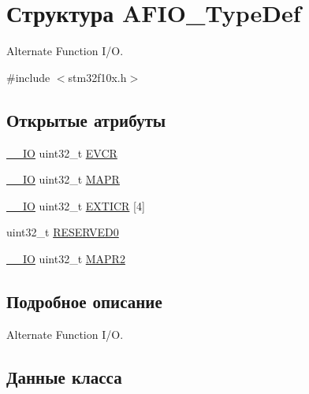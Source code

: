 \hypertarget{struct_a_f_i_o___type_def}{}\section{Структура A\+F\+I\+O\+\_\+\+Type\+Def}
\label{struct_a_f_i_o___type_def}


Alternate Function I/O.  




{\ttfamily \#include $<$stm32f10x.\+h$>$}

\subsection*{Открытые атрибуты}
\begin{DoxyCompactItemize}
\item 
\mbox{\hyperlink{group___c_m_s_i_s___c_m3__core__definitions_gaec43007d9998a0a0e01faede4133d6be}{\+\_\+\+\_\+\+IO}} uint32\+\_\+t \mbox{\hyperlink{struct_a_f_i_o___type_def_a377d5227cd20950e4489cd04df16500f}{E\+V\+CR}}
\item 
\mbox{\hyperlink{group___c_m_s_i_s___c_m3__core__definitions_gaec43007d9998a0a0e01faede4133d6be}{\+\_\+\+\_\+\+IO}} uint32\+\_\+t \mbox{\hyperlink{struct_a_f_i_o___type_def_a2b44ba1a427df7d8c0b254f869b9b463}{M\+A\+PR}}
\item 
\mbox{\hyperlink{group___c_m_s_i_s___c_m3__core__definitions_gaec43007d9998a0a0e01faede4133d6be}{\+\_\+\+\_\+\+IO}} uint32\+\_\+t \mbox{\hyperlink{struct_a_f_i_o___type_def_a5f590aa12271be60c2f61b0a6d2b8772}{E\+X\+T\+I\+CR}} \mbox{[}4\mbox{]}
\item 
uint32\+\_\+t \mbox{\hyperlink{struct_a_f_i_o___type_def_a6cf52816787797115664f0c8167a92b9}{R\+E\+S\+E\+R\+V\+E\+D0}}
\item 
\mbox{\hyperlink{group___c_m_s_i_s___c_m3__core__definitions_gaec43007d9998a0a0e01faede4133d6be}{\+\_\+\+\_\+\+IO}} uint32\+\_\+t \mbox{\hyperlink{struct_a_f_i_o___type_def_a4420b9fe25158ac2e5e32f6ad9d1b6ca}{M\+A\+P\+R2}}
\end{DoxyCompactItemize}


\subsection{Подробное описание}
Alternate Function I/O. 

\subsection{Данные класса}
\mbox{\label{struct_a_f_i_o___type_def_a377d5227cd20950e4489cd04df16500f}} 
